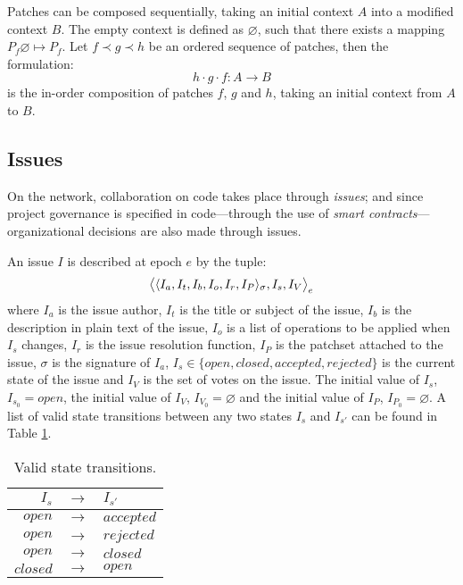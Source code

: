 Patches can be composed sequentially, taking an initial context $A$ into
a modified context $B$. The empty context is defined as $\varnothing$, such
that there exists a mapping $P_f \varnothing \mapsto P_f$. Let $f \prec g
\prec h$ be an ordered sequence of patches, then the formulation:
\[
    h \cdot g \cdot f : A \to B
\]
is the in-order composition of patches $f$, $g$ and $h$, taking an initial
context from $A$ to $B$.


\subsection{Issues}
\label{issues}

On the \oscoin{} network, collaboration on code takes place through \emph{issues};
and since project governance is specified in code---through the use of
\emph{smart contracts}---organizational decisions are also made through issues.


An issue $I$ is described at epoch $e$ by the tuple:
\[
    \big<\langle I_a, I_t, I_b, I_o, I_r, I_P \rangle_{\sigma}, I_s, I_V \big>_e
\]
where $I_a$ is the issue author, $I_t$ is the title or subject of the issue,
$I_b$ is the description in plain text of the issue, $I_o$ is a list of
operations to be applied when $I_s$ changes, $I_r$ is the issue resolution
function, $I_P$ is the patchset attached to the issue, $\sigma$ is the
signature of $I_a$, $I_s \in \{open, closed, accepted, rejected\}$ is the
current state of the issue and $I_V$ is the set of votes on the issue. The
initial value of $I_s$, $I_{s_0} = open$, the initial value of $I_V$, $I_{V_0}
= \varnothing$ and the initial value of $I_P$, $I_{P_0} = \varnothing$.  A list
of valid state transitions between any two states $I_s$ and $I_{s'}$ can be
found in Table \ref{issues-valid-transitions}.

\begin{table}[hbt]
    \caption{Valid state transitions.\label{issues-valid-transitions}}
    \begin{tabular}{rcl}
        \toprule
        $I_s$      & $\to$ & $I_{s'}$ \\
        \midrule
        $open$     & $\to$ & $accepted$ \\
        $open$     & $\to$ & $rejected$ \\
        $open$     & $\to$ & $closed$ \\
        $closed$   & $\to$ & $open$ \\
        \bottomrule
    \end{tabular}
\end{table}

